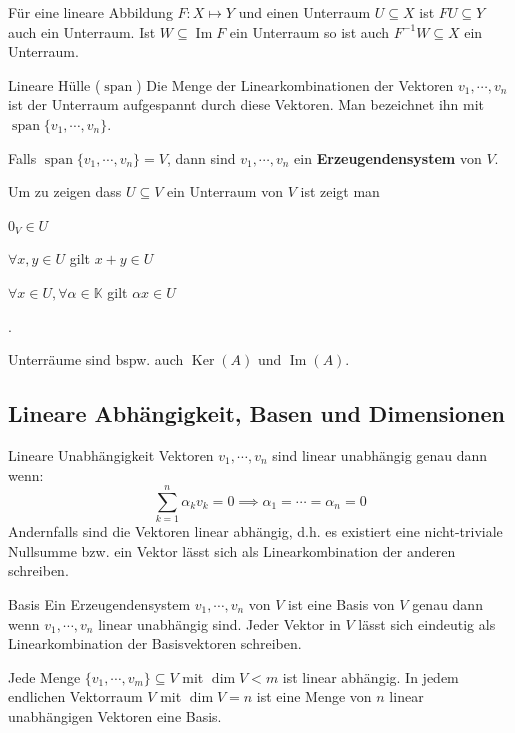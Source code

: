 \documentclass[a4paper,10pt]{article}
\DeclareMathOperator{\Image}{Im}
\DeclareMathOperator{\Kernel}{Ker}
\DeclareMathOperator{\Span}{span}
\def\K{\mathbb{K}}
\begin{document}
Für eine lineare Abbildung $F: X \mapsto Y$ und einen Unterraum $U \subseteq X$ ist $FU \subseteq Y$ auch ein Unterraum. Ist $W \subseteq \Image F$ ein Unterraum so ist auch $F^{-1}W \subseteq X$ ein Unterraum.

\begin{subbox}{Lineare Hülle ($\Span$)}
  Die Menge der Linearkombinationen der Vektoren $v_1, \cdots, v_n$ ist der Unterraum aufgespannt durch diese Vektoren. Man bezeichnet ihn mit $\Span \{ v_1, \cdots, v_n \}$.
\end{subbox}

Falls $\Span \{v_1, \cdots, v_n\} = V$, dann sind $v_1, \cdots, v_n$ ein \textbf{Erzeugendensystem} von $V$.

Um zu zeigen dass $U \subseteq V$ ein Unterraum von $V$ ist zeigt man 
\begin{rowlist}
  \item $0_V \in U$
  \item $\forall x, y \in U$ gilt $x + y \in U$
  \item $\forall x \in U, \forall \alpha \in \K$ gilt $\alpha x \in U$
\end{rowlist}.

Unterräume sind bspw. auch $\Kernel(A)$ und $\Image(A)$.

\subsection{Lineare Abhängigkeit, Basen und Dimensionen}

\begin{mainbox}{Lineare Unabhängigkeit}
  Vektoren $v_1, \cdots, v_n$ sind linear unabhängig genau dann wenn:
  $$\sum_{k=1}^n \alpha_k v_k = 0 \implies \alpha_1 = \cdots = \alpha_n = 0$$
  Andernfalls sind die Vektoren linear abhängig, d.h. es existiert eine nicht-triviale Nullsumme bzw. ein Vektor lässt sich als Linearkombination der anderen schreiben.
\end{mainbox}

\begin{mainbox}{Basis}
  Ein Erzeugendensystem $v_1, \cdots, v_n$ von $V$ ist eine Basis von $V$ genau dann wenn $v_1, \cdots, v_n$ linear unabhängig sind. Jeder Vektor in $V$ lässt sich eindeutig als Linearkombination der Basisvektoren schreiben.
\end{mainbox}

Jede Menge $\{v_1, \cdots, v_m\} \subseteq V$ mit $\dim V < m$ ist linear abhängig. In jedem endlichen Vektorraum $V$ mit $\dim V = n$ ist eine Menge von $n$ linear unabhängigen Vektoren eine Basis.
\end{document}
